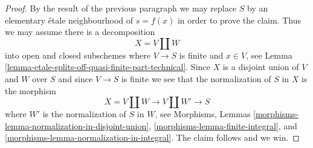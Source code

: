 \begin{proof}
\medskip\noindent
By the result of the previous paragraph we may replace $S$ by an
elementary \'etale neighbourhood of $s = f(x)$ in order to prove the claim.
Thus we may assume there is a decomposition
$$
X = V \amalg W
$$
into open and closed subschemes where $V \to S$ is finite and $x \in V$,
see Lemma \ref{lemma-etale-splits-off-quasi-finite-part-technical}.
Since $X$ is a disjoint union of $V$ and $W$ over $S$ and since
$V \to S$ is finite we see that the
normalization of $S$ in $X$ is the morphism
$$
X = V \amalg W \longrightarrow V \amalg W' \longrightarrow S
$$
where $W'$ is the normalization of $S$ in $W$, see
Morphisms, Lemmas \ref{morphisms-lemma-normalization-in-disjoint-union},
\ref{morphisms-lemma-finite-integral}, and
\ref{morphisms-lemma-normalization-in-integral}.
The claim follows and we win.
\end{proof}